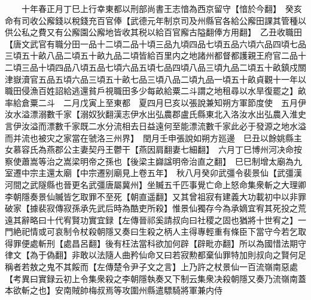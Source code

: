 　　十年春正月丁巳上行幸東都以刑部尚書王志愔為西京留守【愔於今翻】　癸亥命有司收公廨錢以稅錢充百官俸【武德元年制京司及州縣官各給公廨田課其管種以供公私之費又有公廨園公廨地皆收其税以給百官廨古隘翻俸方用翻】　乙丑收職田【唐文武官有職分田一品十二頃二品十頃三品九頃四品七頃五品六頃六品四頃七品三頃五十畝八品二頃五十畝九品二頃皆給百里内之地諸州都督都護親王府官二品十二頃三品十頃四品八頃五品七頃六品五頃七品四頃八品三頃九品二頃五十畝鎮戍關津嶽瀆官五品五頃六品三頃五十畝七品三頃八品二頃九品一頃五十畝貞觀十一年以職田侵漁百姓詔給逃還貧戶視職田多少每畝給粟二斗謂之地租尋以水旱復罷之】畝率給倉粟二斗　二月戊寅上至東都　夏四月巳亥以張說兼知朔方軍節度使　五月伊汝水溢漂溺數千家【溺奴狄翻漢志伊水出弘農郡盧氏縣東北入洛汝水出弘農入淮史言伊汝溢而漂數千家既二水分流相去日益遠何至能漂流數千家此必于發源之地水溢而并流也被灾之家當在虢洛三州界】　閏月壬申張說如朔方廵邊　巳丑以餘姚縣主女慕容氏為燕郡公主妻契丹王鬱干【燕因肩翻妻七細翻】　六月丁巳博州河决命按察使蕭嵩等治之嵩梁明帝之孫也【後梁主巋諡明帝治直之翻】　巳巳制增太廟為九室遷中宗主還太廟【中宗遷别廟見上卷五年】　秋八月癸卯武彊令裴景仙【武彊漢河間之武隧縣也晉更名武彊唐屬冀州】坐贓五千匹事覺亡命上怒命集衆斬之大理卿李朝隱奏景仙贓皆乞取罪不至死【朝直遥翻】又其曾祖寂有建義大功載初中以非罪破家【據裴寂傳寂孫承先武后時為酷吏所殺】惟景仙獨存今為承嫡宜宥其死投之荒遠其辭略曰十代宥賢功實宜録【左傳晉祁奚請叔向曰社稷之固也猶將十世宥之】一門絶祀情或可哀制令杖殺朝隱又奏曰生殺之柄人主得專輕重有條臣下當守今若乞取得罪便處斬刑【處昌呂翻】後有枉法當科欲加何辟【辟毗亦翻】所以為國惜法期守律文【為于偽翻】非敢以法隨人曲矜仙命又曰若寂勲都棄仙罪特加則叔向之賢何足稱者若敖之鬼不其餒而【左傳楚令尹子文之言】上乃許之杖景仙一百流嶺南惡處【考異曰實録云初上令集衆殺之李朝隱執奏又下制云集衆决殺朝隱又奏乃流嶺南蓋本欲斬之也】安南賊帥梅叔焉等攻圍州縣遣驃騎將軍兼内侍

